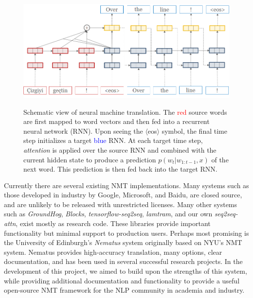 \documentclass[11pt,a4paper]{article}
\begin{document}
\begin{figure}
  \centering
  \includegraphics[width=\linewidth]{simple-attn}
  \label{fig:rnn}
  \caption{\small Schematic view of neural machine translation. The \textcolor{red}{red} source words are first mapped to word vectors and then fed into a recurrent neural network (RNN). Upon seeing the $\langle$eos$\rangle$ symbol, the final time step initializes a target \textcolor{blue}{blue} RNN. At each target time step, \textit{attention} is applied over the source RNN and combined with the current hidden state to produce a prediction $p(w_t| w_{1: t-1}, x)$ of the next word. This prediction is then fed back into the target RNN.}
\end{figure}


Currently there are several existing NMT implementations. Many systems
such as those developed in industry by Google, Microsoft, and Baidu,
are closed source, and are unlikely to be released with unrestricted
licenses. Many other systems such as \textit{GroundHog},
\textit{Blocks}, \textit{tensorflow-seq2seq}, \textit{lamtram}, and
our own \textit{seq2seq-attn}, exist mostly as research code. These
libraries provide important functionality but minimal support to
production users. Perhaps most promising is the University of
Edinburgh's \textit{Nematus} system originally based on NYU's NMT
system. Nematus provides high-accuracy translation, many options,
clear documentation, and has been used in several successful research
projects. In the development of this project, we aimed to build upon
the strengths of this system, while providing additional documentation
and functionality to provide a useful open-source NMT framework for
the NLP community in academia and industry.
\end{document}
